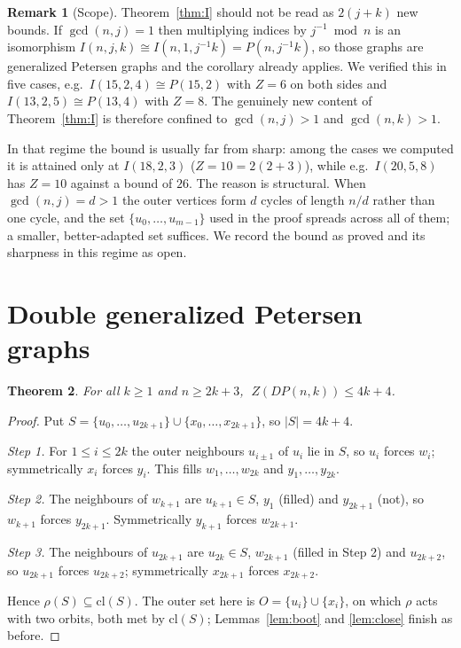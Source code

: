 \documentclass[11pt]{article}
\newtheorem{theorem}{Theorem}
\theoremstyle{definition}
\newtheorem{remark}[theorem]{Remark}
\begin{document}
\begin{remark}[Scope]\label{rem:scope}
Theorem~\ref{thm:I} should not be read as $2(j+k)$ new bounds. If
$\gcd(n,j)=1$ then multiplying indices by $j^{-1}\bmod n$ is an isomorphism
$I(n,j,k)\cong I(n,1,j^{-1}k)=P(n,j^{-1}k)$, so those graphs are generalized
Petersen graphs and the corollary already applies. We verified this in five
cases, e.g.\ $I(15,2,4)\cong P(15,2)$ with $Z=6$ on both sides and
$I(13,2,5)\cong P(13,4)$ with $Z=8$. The genuinely new content of
Theorem~\ref{thm:I} is therefore confined to $\gcd(n,j)>1$ and $\gcd(n,k)>1$.

In that regime the bound is usually far from sharp: among the cases we
computed it is attained only at $I(18,2,3)$ ($Z=10=2(2+3)$), while e.g.\
$I(20,5,8)$ has $Z=10$ against a bound of $26$. The reason is structural. When
$\gcd(n,j)=d>1$ the outer vertices form $d$ cycles of length $n/d$ rather than
one cycle, and the set $\{u_0,\dots,u_{m-1}\}$ used in the proof spreads across
all of them; a smaller, better-adapted set suffices. We record the bound as
proved and its sharpness in this regime as open.
\end{remark}

\section{Double generalized Petersen graphs}
\begin{theorem}\label{thm:DP}
For all $k\ge1$ and $n\ge2k+3$, $\;Z(DP(n,k))\le 4k+4$.
\end{theorem}

\begin{proof}
Put $S=\{u_0,\dots,u_{2k+1}\}\cup\{x_0,\dots,x_{2k+1}\}$, so $|S|=4k+4$.

\emph{Step 1.} For $1\le i\le 2k$ the outer neighbours $u_{i\pm1}$ of $u_i$
lie in $S$, so $u_i$ forces $w_i$; symmetrically $x_i$ forces $y_i$. This
fills $w_1,\dots,w_{2k}$ and $y_1,\dots,y_{2k}$.

\emph{Step 2.} The neighbours of $w_{k+1}$ are $u_{k+1}\in S$, $y_1$ (filled)
and $y_{2k+1}$ (not), so $w_{k+1}$ forces $y_{2k+1}$. Symmetrically $y_{k+1}$
forces $w_{2k+1}$.

\emph{Step 3.} The neighbours of $u_{2k+1}$ are $u_{2k}\in S$, $w_{2k+1}$
(filled in Step 2) and $u_{2k+2}$, so $u_{2k+1}$ forces $u_{2k+2}$;
symmetrically $x_{2k+1}$ forces $x_{2k+2}$.

Hence $\rho(S)\subseteq\mathrm{cl}(S)$. The outer set here is
$O=\{u_i\}\cup\{x_i\}$, on which $\rho$ acts with two orbits, both met by
$\mathrm{cl}(S)$; Lemmas~\ref{lem:boot} and \ref{lem:close} finish as before.
\end{proof}
\end{document}

